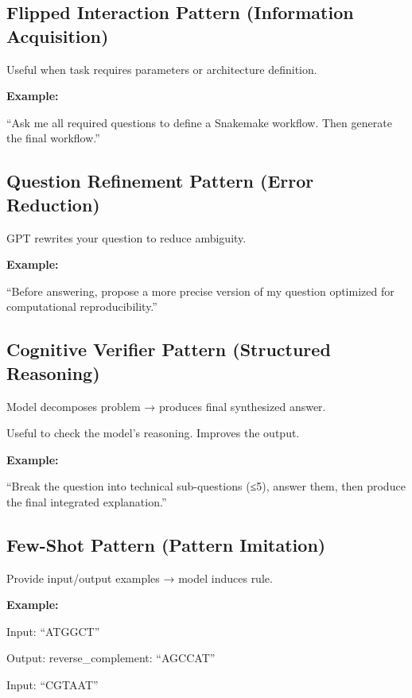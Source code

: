 \documentclass[
  letterpaper,
  DIV=11,
  numbers=noendperiod]{scrreprt}
\begin{document}
\subsection{Flipped Interaction Pattern (Information
Acquisition)}\label{flipped-interaction-pattern-information-acquisition}

Useful when task requires parameters or architecture definition.

\textbf{Example:}

``Ask me all required questions to define a Snakemake workflow. Then
generate the final workflow.''

\subsection{Question Refinement Pattern (Error
Reduction)}\label{question-refinement-pattern-error-reduction}

GPT rewrites your question to reduce ambiguity.

\textbf{Example:}

``Before answering, propose a more precise version of my question
optimized for computational reproducibility.''

\subsection{Cognitive Verifier Pattern (Structured
Reasoning)}\label{cognitive-verifier-pattern-structured-reasoning}

Model decomposes problem → produces final synthesized answer.

Useful to check the model's reasoning. Improves the output.

\textbf{Example:}

``Break the question into technical sub-questions (≤5), answer them,
then produce the final integrated explanation.''

\subsection{Few-Shot Pattern (Pattern
Imitation)}\label{few-shot-pattern-pattern-imitation}

Provide input/output examples → model induces rule.

\textbf{Example:}

Input: ``ATGGCT''

Output: reverse\_complement: ``AGCCAT''

\hfill\break
Input: ``CGTAAT''
\end{document}
